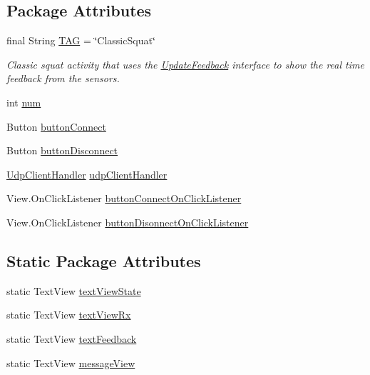 \subsection*{Package Attributes}
\begin{DoxyCompactItemize}
\item 
final String \mbox{\hyperlink{classcom_1_1example_1_1trainawearapplication_1_1_classic_squat_ae6a47d8f52c7e129b5c4e5aa43cec9b8}{T\+AG}} = \char`\"{}Classic\+Squat\char`\"{}
\begin{DoxyCompactList}\small\item\em Classic squat activity that uses the \mbox{\hyperlink{interfacecom_1_1example_1_1trainawearapplication_1_1_update_feedback}{Update\+Feedback}} interface to show the real time feedback from the sensors. \end{DoxyCompactList}\item 
int \mbox{\hyperlink{classcom_1_1example_1_1trainawearapplication_1_1_classic_squat_ab4316fd702bd0c189fa793dc41f2995e}{num}}
\item 
Button \mbox{\hyperlink{classcom_1_1example_1_1trainawearapplication_1_1_classic_squat_a3440f30328b7562e110dd8c18b383173}{button\+Connect}}
\item 
Button \mbox{\hyperlink{classcom_1_1example_1_1trainawearapplication_1_1_classic_squat_a21830f347f9c87c434a386343a40b9e0}{button\+Disconnect}}
\item 
\mbox{\hyperlink{classcom_1_1example_1_1trainawearapplication_1_1_udp_client_handler}{Udp\+Client\+Handler}} \mbox{\hyperlink{classcom_1_1example_1_1trainawearapplication_1_1_classic_squat_a2fd124851e56c8d1a8c7bdbf8fdd8796}{udp\+Client\+Handler}}
\item 
View.\+On\+Click\+Listener \mbox{\hyperlink{classcom_1_1example_1_1trainawearapplication_1_1_classic_squat_ace73442a5216f7ba8af6c52493a02261}{button\+Connect\+On\+Click\+Listener}}
\item 
View.\+On\+Click\+Listener \mbox{\hyperlink{classcom_1_1example_1_1trainawearapplication_1_1_classic_squat_af910d4182e1e041e1adee94f39268aa3}{button\+Disonnect\+On\+Click\+Listener}}
\end{DoxyCompactItemize}
\subsection*{Static Package Attributes}
\begin{DoxyCompactItemize}
\item 
static Text\+View \mbox{\hyperlink{classcom_1_1example_1_1trainawearapplication_1_1_classic_squat_ad8bc903195e44df7325c5d029c5d25a3}{text\+View\+State}}
\item 
static Text\+View \mbox{\hyperlink{classcom_1_1example_1_1trainawearapplication_1_1_classic_squat_ade810bed698597e4093219510d9025ef}{text\+View\+Rx}}
\item 
static Text\+View \mbox{\hyperlink{classcom_1_1example_1_1trainawearapplication_1_1_classic_squat_abe99a555b09158d10bcc52c92af69341}{text\+Feedback}}
\item 
static Text\+View \mbox{\hyperlink{classcom_1_1example_1_1trainawearapplication_1_1_classic_squat_a7a13bea1e66bb87427aa5974ebae838e}{message\+View}}
\end{DoxyCompactItemize}
